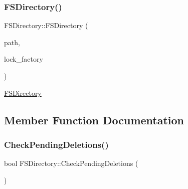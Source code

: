\subsubsection{\texorpdfstring{F\+S\+Directory()}{FSDirectory()}}
{\footnotesize\ttfamily F\+S\+Directory\+::\+F\+S\+Directory (\begin{DoxyParamCaption}\item[{\mbox{\hyperlink{ZlibCrc32_8h_a2c212835823e3c54a8ab6d95c652660e}{const}} std\+::string}]{path,  }\item[{\mbox{\hyperlink{ZlibCrc32_8h_a2c212835823e3c54a8ab6d95c652660e}{const}} std\+::shared\+\_\+ptr$<$ \mbox{\hyperlink{classlucene_1_1core_1_1store_1_1LockFactory}{Lock\+Factory}} $>$ \&}]{lock\+\_\+factory }\end{DoxyParamCaption})\hspace{0.3cm}{\ttfamily [protected]}}

\mbox{\hyperlink{classlucene_1_1core_1_1store_1_1FSDirectory}{F\+S\+Directory}} 

\subsection{Member Function Documentation}
\mbox{\label{classlucene_1_1core_1_1store_1_1FSDirectory_a82323816746e66f25406ce12a533b6b2}} 
\subsubsection{\texorpdfstring{Check\+Pending\+Deletions()}{CheckPendingDeletions()}}
{\footnotesize\ttfamily bool F\+S\+Directory\+::\+Check\+Pending\+Deletions (\begin{DoxyParamCaption}{ }\end{DoxyParamCaption})}

\mbox{\label{classlucene_1_1core_1_1store_1_1FSDirectory_a5d0ea9b7fb90cbf6647276089a95b1a8}} 
